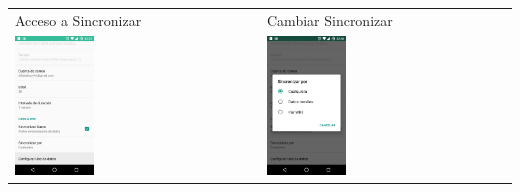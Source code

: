 {\begin{table}[!htbp]
\begin{tabular}{ll}
\textsf{\relax 
Acceso a Sincronizar
} & \textsf{\relax 
Cambiar Sincronizar
}\\
    {\includegraphics[width=0.33\textwidth]{anexos/graphics/conf_usage.jpg}}
 & 
    {\includegraphics[width=0.33\textwidth]{anexos/graphics/conf_sync.jpg}}
\\
\end{tabular}
\end{table}



}

